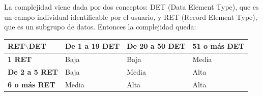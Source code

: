 \documentclass[spanish,a4paper,11pt, twoside]{report}	%
\begin{document}
	La complejidad viene dada por dos conceptos: DET (Data Element Type), que es un campo individual identificable por el usuario, y RET (Record Element Type), que es un subgrupo de datos. Entonces la complejidad queda: 

\vspace{0.35cm}

			\begin{tabular}{|p{3cm}||p{3cm}|p{3.2cm}|p{3cm}|}
				\hline
				\textbf{RET$\backslash$DET} & \textbf{De 1 a 19 DET} & \textbf{De 20 a 50 DET} & \textbf{51  o más DET} \\ \hline \hline
				\textbf{1 RET} & Baja & Baja & Media \\ \hline 
				\textbf{De 2 a 5 RET} & Baja & Media & Alta \\ \hline 
				\textbf{6 o más RET} & Media & Alta & Alta \\ \hline 
			\end{tabular}

\vspace{0.35cm}
\end{document}
